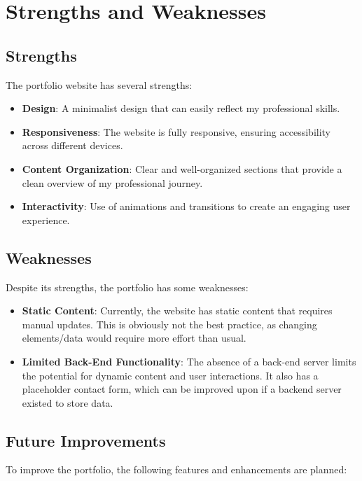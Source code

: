 \documentclass[15pt]{report}
\begin{document}
\chapter{Strengths and Weaknesses}

\section{Strengths}

The portfolio website has several strengths:

\begin{itemize}

    \item \textbf{Design}: A minimalist design that can easily reflect my professional skills.
    \item \textbf{Responsiveness}: The website is fully responsive, ensuring accessibility across different devices.
    \item \textbf{Content Organization}: Clear and well-organized sections that provide a clean overview of my professional journey.
    \item \textbf{Interactivity}: Use of animations and transitions to create an engaging user experience.

\end{itemize}

\section{Weaknesses}
Despite its strengths, the portfolio has some weaknesses:

\begin{itemize}

    \item \textbf{Static Content}: Currently, the website has static content that requires manual updates. This is obviously not the best practice, as changing elements/data would require more effort than usual. 
    \item \textbf{Limited Back-End Functionality}: The absence of a back-end server limits the potential for dynamic content and user interactions. It also has a placeholder contact form, which can be improved upon if a backend server existed to store data.

\end{itemize}

\section{Future Improvements}
To improve the portfolio, the following features and enhancements are planned:
\end{document}
